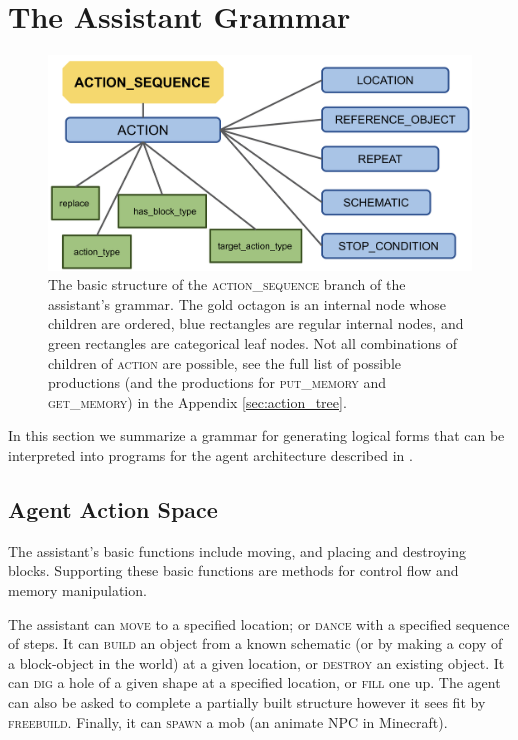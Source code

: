 \section{The Assistant Grammar}
\label{sec:grammar}
\begin{figure}
	\centering
     \includegraphics[width=.72\linewidth ]{figures/AS.png}

    \caption{The basic structure of the \textsc{action\_sequence} branch of the assistant's grammar.   The gold octagon is an internal node whose children are ordered,  blue rectangles are regular internal nodes,  and green rectangles are categorical leaf nodes.   Not all combinations of children of \textsc{action} are possible, see the full list of possible productions (and the productions for \textsc{put\_memory} and \textsc{get\_memory})  in the Appendix \ref{sec:action_tree}.}
    \label{fig:AS}
    
\end{figure}


 In this section we summarize a grammar for generating logical forms that can be interpreted into programs for the agent architecture described in \cite{gray2019craftassist}.

\subsection{Agent Action Space}
The assistant's basic functions include moving, and placing and destroying blocks.  Supporting these basic functions are methods for control flow and memory manipulation.  

\smallskip

 The assistant can \textsc{move} to a specified location; or \textsc{dance} with a specified sequence of steps.  It can \textsc{build} an object from a known schematic (or by making a copy of a block-object in the world) at a given location, or \textsc{destroy} an existing object.  It can \textsc{dig} a hole of a given shape at a specified location, or \textsc{fill} one up. The agent can also be asked to complete a partially built structure however it sees fit by \textsc{freebuild}.  Finally, it can \textsc{spawn} a mob (an animate NPC in Minecraft).    

